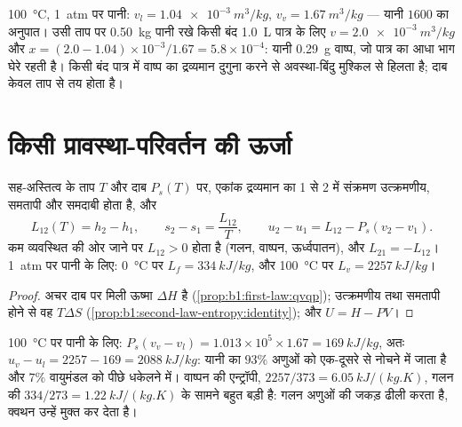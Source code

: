 \begin{example}[केतली और बॉयलर]\label{ex:b1:phase-changes:lever}
\qty{100}{\degreeCelsius}, \qty{1}{atm} पर पानी: $v_l = \qty{1.04e-3}{m^3/kg}$,
$v_v = \qty{1.67}{m^3/kg}$ --- यानी $1600$ का अनुपात। उसी ताप पर
\qty{0.50}{kg} पानी रखे किसी बंद \qty{1.0}{L} पात्र के लिए $v =
\qty{2.0e-3}{m^3/kg}$ और $x = (2.0 - 1.04) \times 10^{-3}/1.67 = 5.8 \times 10^{-4}$:
यानी \qty{0.29}{g} वाष्प, जो पात्र का आधा भाग घेरे रहती है। किसी बंद पात्र
में वाष्प का द्रव्यमान दुगुना करने से अवस्था-बिंदु मुश्किल से हिलता है; दाब
केवल ताप से तय होता है।
\end{example}

\section{किसी प्रावस्था-परिवर्तन की ऊर्जा}

\begin{proposition}[गुप्त ऊष्मा, संक्रमण की एन्थैल्पी और एन्ट्रॉपी]\label{prop:b1:phase-changes:latent}
सह-अस्तित्व के ताप $T$ और दाब $P_s(T)$ पर, एकांक द्रव्यमान का  1
से  2 में संक्रमण उत्क्रमणीय, समतापी और समदाबी होता है, और
\[
L_{12}(T) = h_2 - h_1 , \qquad s_2 - s_1 = \frac{L_{12}}{T} , \qquad
u_2 - u_1 = L_{12} - P_s(v_2 - v_1) .
\]
कम व्यवस्थित  की ओर जाने पर $L_{12} > 0$ होता है (गलन,
वाष्पन, ऊर्ध्वपातन), और $L_{21} = -L_{12}$। \qty{1}{atm} पर पानी के लिए:
\qty{0}{\degreeCelsius} पर $L_f = \qty{334}{kJ/kg}$, और
\qty{100}{\degreeCelsius} पर $L_v = \qty{2257}{kJ/kg}$।
\end{proposition}

\begin{proof}
अचर दाब पर मिली ऊष्मा $\Delta H$ है (\cref{prop:b1:first-law:qvqp});
उत्क्रमणीय तथा समतापी होने से वह $T\Delta S$
(\cref{prop:b1:second-law-entropy:identity}); और $U = H - PV$।
\end{proof}

\begin{example}[वाष्पन की ऊष्मा जाती कहाँ है]\label{ex:b1:phase-changes:whereheat}
\qty{100}{\degreeCelsius} पर पानी के लिए: $P_s(v_v - v_l) = 1.013 \times 10^5 \times
1.67 = \qty{169}{kJ/kg}$, अतः $u_v - u_l = 2257 - 169 = \qty{2088}{kJ/kg}$:
यानी  का $93\%$ अणुओं को एक-दूसरे से नोचने में जाता है और $7\%$
वायुमंडल को पीछे धकेलने में। वाष्पन की एन्ट्रॉपी,
$2257/373 = \qty{6.05}{kJ/(kg.K)}$, गलन की $334/273 =
\qty{1.22}{kJ/(kg.K)}$ के सामने बहुत बड़ी है: गलन अणुओं की जकड़ ढीली करता है,
क्वथन उन्हें मुक्त कर देता है।
\end{example}

